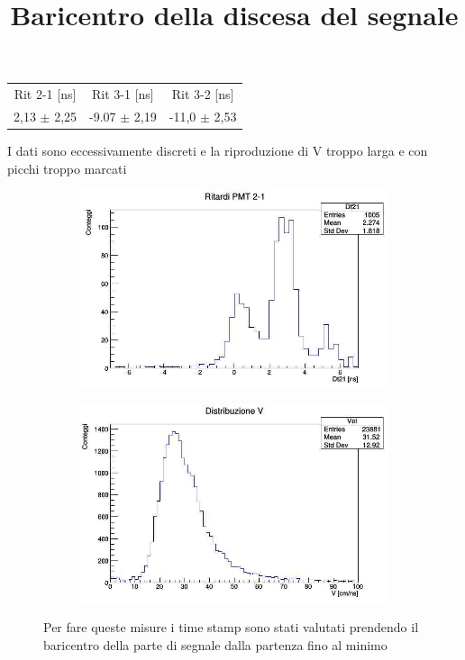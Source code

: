 \documentclass[a4paper]{article}
\begin{document}
\begin{tabular}{c|c|c}
Rit 2-1 [ns] & Rit 3-1 [ns] & Rit 3-2 [ns] \\
\hfill
2,13 $\pm$ 2,25 & -9.07 $\pm$ 2,19 & -11,0 $\pm$ 2,53
\hfill
\label{tab:RitMidNegSlo}
\end{tabular}

I dati sono eccessivamente discreti e la riproduzione di V troppo larga e con picchi troppo marcati

\begin{figure}[H]
     \centering
     \title{Baricentro della discesa del segnale}
     \begin{center}
     \begin{subfigure}[b]{0.4\textwidth}
         \centering
         \includegraphics[width=\textwidth]{./immagini/TimeOfFlight/Rit21IntNegSlo.jpg}
         \caption{}
         \label{fig:Dt21IntNegSlo}
     \end{subfigure}
     \hfill
     \begin{subfigure}[b]{0.4\textwidth}
         \centering
         \includegraphics[width=\textwidth]{./immagini/TimeOfFlight/VIntNegSlo.jpg}
         \caption{}
         \label{fig:VIntNegSlo}
     \end{subfigure}
     \end{center}
     \caption{Per fare queste misure i time stamp sono stati valutati prendendo il baricentro della parte di segnale dalla partenza fino al minimo}        
     \label{fig:IntNegSlo}
\end{figure}
\end{document}
